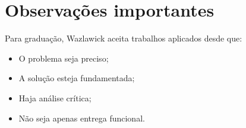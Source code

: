 \documentclass[
    12pt,                %
    openright,           %
    oneside,             %
    a4paper,             %
    english,             %
    brazil               %
]{abntex2}
\begin{document}
\chapter*{Observações importantes}

Para graduação, Wazlawick aceita trabalhos aplicados desde que:
\begin{itemize}
    \item O problema seja preciso;
    \item A solução esteja fundamentada;
    \item Haja análise crítica;
    \item Não seja apenas entrega funcional.
\end{itemize}




\end{document}
